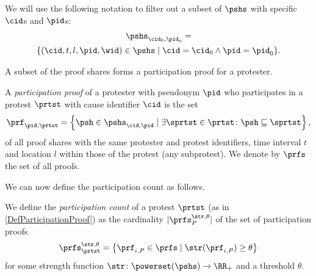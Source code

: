 We will use the following notation to filter out a subset of \(\pshs\) with specific \(\cid\)s and \(\pid\)s:
\begin{multline*}
  \pshs_{\cid_0, \pid_0} = \\
  \{(\cid, t, l, \pid, \wid)\in \pshs\mid \cid = \cid_0 \land \pid = \pid_0\}.
\end{multline*}

A subset of the proof shares forms a participation proof for a protester.

\begin{definition}%
  \label{DefParticipationProof}\label{DefParticipationProofs}
  A \emph{participation proof} of a protester with pseudonym \(\pid\) who participates in a protest \(\prtst\) with cause identifier \(\cid\) is the 
  set
  \begin{equation}
    \nonumber
    \prf_{\pid, \prtst} =
    \left\{ \psh \in \pshs_{\cid, \pid} \mid
      \exists \sprtst\in \prtst\colon \psh\sqsubseteq \sprtst \right\},
  \end{equation}
  of all proof shares with the same protester and protest identifiers, time interval \(t\) and location \(l\) within those of the protest (\ie any subprotest).
  We denote by \(\prfs\) the set of all proofs.
\end{definition}

\NewFunction{\str}{\varsigma}

We can now define the participation count as follows.
\begin{definition}%
  \label{DefParticipationCount}
  We define the \emph{participation count} of a protest \(\prtst\) (as in \cref{DefParticipationProof}) as the cardinality 
  \(|\prfs_{P}^{\str,\theta}|\) of the set of participation proofs \[
    \prfs_{\prtst}^{\str,\theta} = \left\{ \prf_{i,P} \in \prfs \mid
      \str(\prf_{i,P})\geq \theta \right\}
  \] for some strength function \(\str\colon \powerset(\pshs)\to \RR_+\) and a 
  threshold \(\theta\).
\end{definition}

